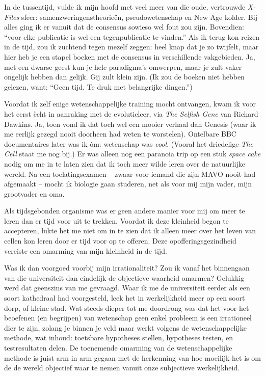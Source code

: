 \documentclass[12pt,a4paper]{article}
\begin{document}
In de tussentijd, vulde ik mijn hoofd met veel meer van die oude, vertrouwde \emph{X-Files} sfeer: samenzweringenstheorieën, pseudowetenschap en New Age kolder. Bij alles ging ik er vanuit dat de consensus sowieso wel fout zou zijn. Bovendien: “voor elke publicatie is wel een tegenpublicatie te vinden.” Als ik terug kon reizen in de tijd, zou ik zuchtend tegen mezelf zeggen: heel knap dat je zo twijfelt, maar hier heb je een stapel boeken met de consensus in verschillende vakgebieden. Ja, met een dwarse geest kun je hele paradigma's omwerpen, maar je zult vaker ongelijk hebben dan gelijk. Gij zult klein zijn. (Ik zou de boeken niet hebben gelezen, want: “Geen tijd. Te druk met belangrijke dingen.”)

Voordat ik zelf enige wetenschappelijke training mocht ontvangen, kwam ik voor het eerst ècht in aanraking met de evolutieleer, via \emph{The Selfish Gene} van Richard Dawkins. Ja, toen vond ik dat toch wel een mooier verhaal dan Genesis (waar ik me eerlijk gezegd nooit doorheen had weten te worstelen). Ontelbare BBC documentaires later was ik òm: wetenschap was \emph{cool}. (Vooral het driedelige \emph{The Cell} staat me nog bij.) Er was alleen nog een paranoia trip op een stuk \emph{space cake} nodig om me in te laten zien dat ik toch meer wilde leren over de natuurlijke wereld. Na een toelatingsexamen – zwaar voor iemand die zijn MAVO nooit had afgemaakt – mocht ik biologie gaan studeren, net als voor mij mijn vader, mijn grootvader en oma.

Als tijdsgebonden organisme was er geen andere manier voor mij om meer te leren dan er tijd voor uit te trekken. Voordat ik deze kleinheid begon te accepteren, lukte het me niet om in te zien dat ik alleen meer over het leven van cellen kon leren door er tijd voor op te offeren. Deze opofferingsgezindheid vereiste een omarming van mijn kleinheid in de tijd.

Was ik dan voorgoed voorbij mijn irrationaliteit? Zou ik vanaf het binnengaan van die universiteit dan eindelijk de objectieve waarheid omarmen? Gelukkig werd dat geenszins van me gevraagd. Waar ik me de universiteit eerder als een soort kathedraal had voorgesteld, leek het in werkelijkheid meer op een soort dorp, of kleine stad. Wat steeds dieper tot me doordrong was dat het voor het beoefenen (en begrijpen) van wetenschap geen enkel probleem is een irrationeel dier te zijn, zolang je binnen je veld maar werkt volgens de wetenschappelijke methode, wat inhoud: toetsbare hypotheses stellen, hypotheses testen, en testresultaten delen. De toenemende omarming van de wetenschappelijke methode is juist arm in arm gegaan met de herkenning van hoe moeilijk het is om de de wereld objectief waar te nemen vanuit onze subjectieve werkelijkheid.
\end{document}
